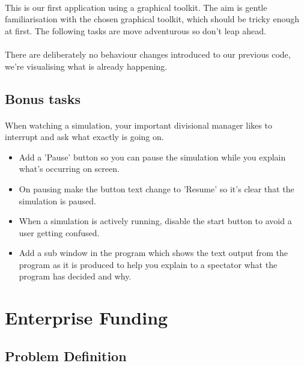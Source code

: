 \documentclass[11pt]{book}
\begin{document}
\paragraph{} This is our first application using a graphical toolkit. The aim is gentle familiarisation with the chosen graphical toolkit, which should be tricky enough at first. The following tasks are move adventurous so don't leap ahead.

\paragraph{} There are deliberately no behaviour changes introduced to our previous code, we're visualising what is already happening.

\subsection{Bonus tasks}

\paragraph{} When watching a simulation, your important divisional manager likes to interrupt and ask what exactly is going on.

\begin{itemize}
\item Add a 'Pause' button so you can pause the simulation while you explain what's occurring on screen.
\item On pausing make the button text change to 'Resume' so it's clear that the simulation is paused.
\item When a simulation is actively running, disable the start button to avoid a user getting confused.
\item Add a sub window in the program which shows the text output from the program as it is produced to help you explain to a spectator what the program has decided and why.
\end{itemize}

\clearpage



\section{Enterprise Funding}

\subsection{Problem Definition}
\end{document}
